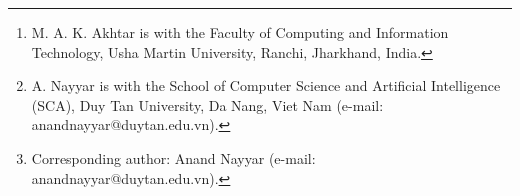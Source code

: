 \author{Mohammad Amir Khusru Akhtar and Anand Nayyar%
\thanks{M. A. K. Akhtar is with the Faculty of Computing and Information Technology, Usha Martin University, Ranchi, Jharkhand, India.}%
\thanks{A. Nayyar is with the School of Computer Science and Artificial Intelligence (SCA), Duy Tan University, Da Nang, Viet Nam (e-mail: anandnayyar@duytan.edu.vn).}%
\thanks{Corresponding author: Anand Nayyar (e-mail: anandnayyar@duytan.edu.vn).}}